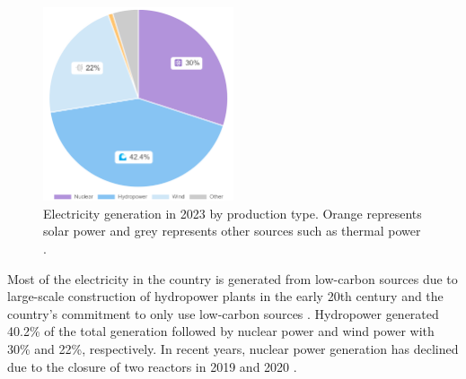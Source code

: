 \begin{figure}[H]
    \centering
    \includegraphics[width=0.5\textwidth]{figures/grossGeneration_2023.png}
    \caption{Electricity generation in 2023 by production type. Orange represents solar power and grey represents other sources such as thermal power \cite{entsoe, lowcarbonpower}.}
    \label{fig:production}
\end{figure}
\noindent
Most of the electricity in the country is generated from low-carbon sources due to large-scale construction of hydropower plants in the early 20th century and the country's commitment to only use low-carbon sources \cite{lowcarbonpower, vattenfall}. Hydropower generated 40.2\% of the total generation followed by nuclear power and wind power with 30\% and 22\%, respectively. In recent years, nuclear power generation has declined due to the closure of two reactors in 2019 and 2020 \cite{energiforetagen}. 

